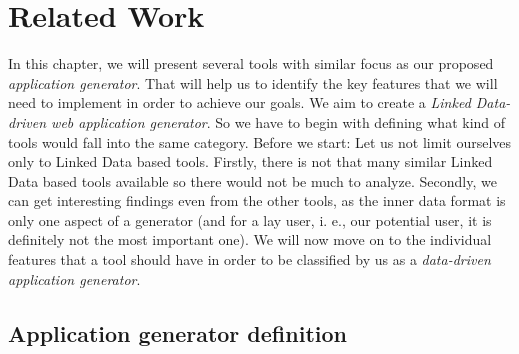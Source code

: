 \chapter{Related Work}
\label{chap:related-work}

In this chapter, we will present several tools with similar focus as our proposed \emph{application generator}. That will help us to identify the key features that we will need to implement in order to achieve our goals. We aim to create a \emph{Linked Data-driven web application generator}. So we have to begin with defining what kind of tools would fall into the same category. Before we start: Let us not limit ourselves only to Linked Data based tools. Firstly, there is not that many similar Linked Data based tools available so there would not be much to analyze. Secondly, we can get interesting findings even from the other tools, as the inner data format is only one aspect of a generator (and for a lay user, i. e., our potential user, it is definitely not the most important one). We will now move on to the individual features that a tool should have in order to be classified by us as a \emph{data-driven application generator}.

\section{Application generator definition}
\label{sec:rw:definition}

